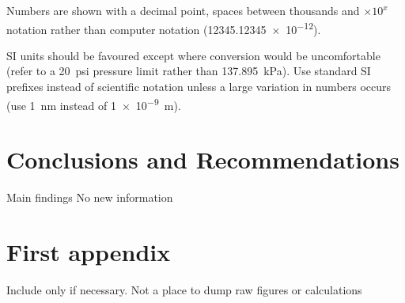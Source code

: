 \documentclass[a4paper,12pt]{article}
\begin{document}
Numbers are shown with a decimal point, spaces between thousands and $\times 10^x$ notation rather than computer notation (\num{12345.12345e-12}).

SI units should be favoured except where conversion would be
uncomfortable (refer to a \SI{20}{psi} pressure limit rather than
\SI{137.895}{\kilo\pascal}).
Use standard
SI prefixes instead of scientific notation unless a large variation in
numbers occurs (use \SI{1}{\nano\meter} instead of \SI{1e-9}{\meter}).

\section{Conclusions and Recommendations}
Main findings
No new information


\printbibliography
\appendix
\renewcommand{\thefigure}{\thesection.\arabic{figure}}
\renewcommand{\thepage}{\thesection.\arabic{page}}
\section{First appendix}
\setcounter{figure}{0}
\setcounter{page}{1}
Include only if necessary. Not a place to dump raw figures or calculations
\end{document}
